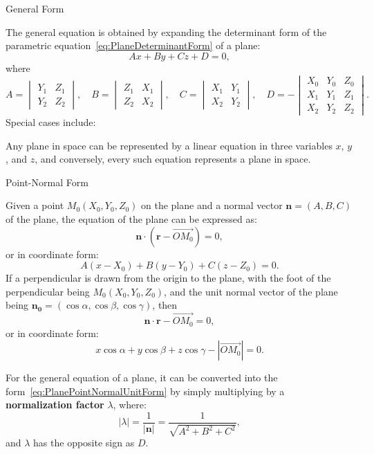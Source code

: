 \documentclass[11pt]{../../TexTemplate/elegantbook} %
\begin{document}
\begin{leftbarTitle}{General Form}\end{leftbarTitle}
The general equation is obtained by expanding the determinant form of 
the parametric equation~\ref{eq:PlaneDeterminantForm} of a plane:
\[
Ax + By + Cz + D = 0,
\]
where
\[
A = \begin{vmatrix} Y_{1} & Z_{1} \\ Y_{2} & Z_{2} \end{vmatrix}, \quad
B = \begin{vmatrix} Z_{1} & X_{1} \\ Z_{2} & X_{2} \end{vmatrix}, \quad
C = \begin{vmatrix} X_{1} & Y_{1} \\ X_{2} & Y_{2} \end{vmatrix}, \quad
D = -\begin{vmatrix} X_{0} & Y_{0} & Z_{0} \\ X_{1} & Y_{1} & Z_{1} \\ X_{2} & Y_{2} & Z_{2} \end{vmatrix}.
\]
Special cases include:

\begin{theorem}
    Any plane in space can be represented by a linear equation in three variables \(x\), \(y\), and \(z\), 
    and conversely, every such equation represents a plane in space.
\end{theorem}

\begin{leftbarTitle}{Point-Normal Form}\end{leftbarTitle}
Given a point \(M_{0}(X_{0}, Y_{0}, Z_{0})\) on the plane and a normal vector \(\mathbf{n} = (A, B, C)\) of the plane,
the equation of the plane can be expressed as:
\[
\mathbf{n} \cdot (\mathbf{r} - \vec{OM_{0}}) = 0,
\]
or in coordinate form:
\[
A(x - X_{0}) + B(y - Y_{0}) + C(z - Z_{0}) = 0.
\]
If a perpendicular is drawn from the origin to the plane, 
with the foot of the perpendicular being \(M_{0}(X_{0}, Y_{0}, Z_{0})\), 
and the unit normal vector of the plane being \(\mathbf{n_{0}} = (\cos \alpha, \cos \beta, \cos \gamma)\), then
\[
\mathbf{n} \cdot \mathbf{r} - \vec{OM_{0}} = 0,
\]
or in coordinate form:
\begin{equation}\label{eq:PlanePointNormalUnitForm}
    x \cos \alpha + y \cos \beta + z \cos \gamma - |\vec{OM_{0}}| = 0.    
\end{equation}

For the general equation of a plane, 
it can be converted into the form~\ref{eq:PlanePointNormalUnitForm} 
by simply multiplying by a \textbf{normalization factor} \(\lambda\), where:
\[
|\lambda| = \frac{1}{|\mathbf{n}|} = \frac{1}{\sqrt{A^2 + B^2 + C^2}},
\]
and \(\lambda\) has the opposite sign as \(D\).
\end{document}
